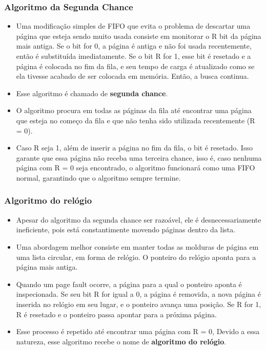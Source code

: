 \documentclass[10pt]{article}
\begin{document}
\subsubsection{Algoritmo da Segunda Chance}
\begin{itemize}
    \item Uma modificação simples de FIFO que evita o problema de descartar uma página
        que esteja sendo muito usada consiste em monitorar o R bit da página mais antiga.
        Se o bit for 0, a página é antiga e não foi usada recentemente, então é substituída
        imediatamente. Se o bit R for 1, esse bit é resetado e a página é colocada no fim
        da fila, e seu tempo de carga é atualizado como se ela tivesse acabado de ser 
        colocada em memória. Então, a busca continua.
    \item Esse algoritmo é chamado de \textbf{segunda chance}.
    \item O algoritmo procura em todas as páginas da fila até encontrar uma página que
        esteja no começo da fila e que não tenha sido utilizada recentemente (R = 0).
    \item Caso R seja 1, além de inserir a página no fim da fila, o bit é resetado. 
        Isso garante que essa página não receba uma terceira chance, isso é, caso
        nenhuma página com R = 0 seja encontrado, o algoritmo funcionará como uma FIFO
        normal, garantindo que o algoritmo sempre termine.
\end{itemize}

\subsubsection{Algoritmo do relógio}
\begin{itemize}
    \item Apesar do algoritmo da segunda chance ser razoável, ele é desnecessariamente 
        ineficiente, pois está constantimente movendo páginas dentro da lista. 
    \item Uma abordagem melhor consiste em manter todas as molduras de página em uma 
        lista circular, em forma de relógio. O ponteiro do relógio aponta para a página
        mais antiga.
    \item Quando um page fault ocorre, a página para a qual o ponteiro aponta é inspecionada.
        Se seu bit R for igual a 0, a página é removida, a nova página é inserida no relógio
        em seu lugar, e o ponteiro avança uma posição. Se R for 1, R é resetado e o ponteiro
        passa apontar para a próxima página.
    \item Esse processo é repetido até encontrar uma página com R = 0, Devido a essa natureza,
        esse algoritmo recebe o nome de \textbf{algoritmo do relógio}.
\end{itemize}
\end{document}

